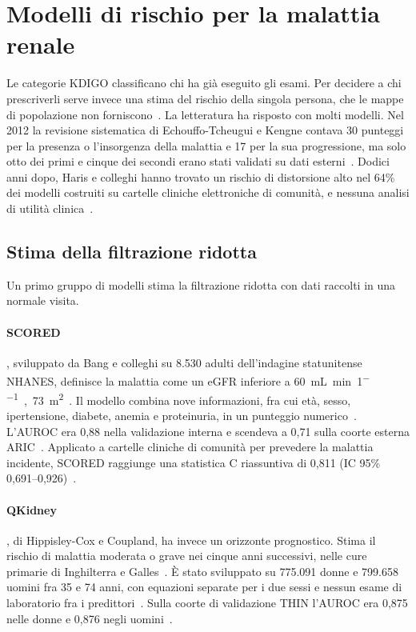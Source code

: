 \documentclass[a4paper, 12pt, oneside]{book}
\begin{document}
\section{Modelli di rischio per la malattia renale}

Le categorie KDIGO classificano chi ha già eseguito gli esami. Per decidere a chi prescriverli serve invece una stima del rischio della singola persona, che le mappe di popolazione non forniscono~\cite{stevens_kdigo_2024}. La letteratura ha risposto con molti modelli. Nel 2012 la revisione sistematica di Echouffo-Tcheugui e Kengne contava 30 punteggi per la presenza o l'insorgenza della malattia e 17 per la sua progressione, ma solo otto dei primi e cinque dei secondi erano stati validati su dati esterni~\cite{echouffo-tcheugui_risk_2012}. Dodici anni dopo, Haris e colleghi hanno  trovato un rischio di distorsione alto nel 64\% dei modelli costruiti su cartelle cliniche elettroniche di comunità, e nessuna analisi di utilità clinica~\cite{haris_prediction_2024}.

\subsection{Stima della filtrazione ridotta}

Un primo gruppo di modelli stima la filtrazione ridotta con dati raccolti in una normale visita. 

\paragraph{SCORED}, sviluppato da Bang e colleghi su 8.530 adulti dell'indagine statunitense NHANES, definisce la malattia come un eGFR inferiore a \SI{60}{\milli\liter\per\minute\per1,73\meter\squared}~\cite{bang_screening_2007}. Il modello combina nove informazioni, fra cui età, sesso, ipertensione, diabete, anemia e proteinuria, in un punteggio numerico~\cite{bang_screening_2007}. L'AUROC era 0,88 nella validazione interna e scendeva a 0,71 sulla coorte esterna ARIC~\cite{bang_screening_2007}. Applicato a cartelle cliniche di comunità per prevedere la malattia incidente, SCORED raggiunge una statistica C riassuntiva di 0,811 (IC 95\% 0,691--0,926)~\cite{haris_prediction_2024}. 

\paragraph{QKidney}, di Hippisley-Cox e Coupland, ha invece un orizzonte prognostico. Stima il rischio di malattia moderata o grave nei cinque anni successivi, nelle cure primarie di Inghilterra e Galles~\cite{hippisley-cox_predicting_2010}. È stato sviluppato su 775.091 donne e 799.658 uomini fra 35 e 74 anni, con equazioni separate per i due sessi e nessun esame di laboratorio fra i predittori~\cite{hippisley-cox_predicting_2010}. Sulla coorte di validazione THIN l'AUROC era 0,875 nelle donne e 0,876 negli uomini~\cite{hippisley-cox_predicting_2010}.
\end{document}
